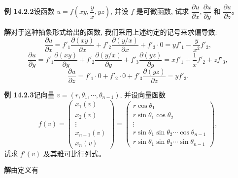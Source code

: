 \documentclass[UTF8,12pt,a4paper,fontset=fandol]{ctexart}
\begin{document}
\noindent\textbf{例 14.2.2}\quad 设函数 $u=f\left(xy,\dfrac yx,yz\right)$, 并设 $f$ 是可微函数, 试求 $\dfrac{\partial u}{\partial x}, \dfrac{\partial u}{\partial y}$ 和 $\dfrac{\partial u}{\partial z}$。

\noindent\textbf{解}\quad 对于这种抽象形式给出的函数, 我们采用上述约定的记号来求偏导数:
\[
  \frac{\partial u}{\partial x}
  =f'_1\frac{\partial(xy)}{\partial x}+f'_2\frac{\partial(y/x)}{\partial x}+f'_3\cdot0
  =yf'_1-\frac{y}{x^2}f'_2,
\]
\[
  \frac{\partial u}{\partial y}
  =f'_1\frac{\partial(xy)}{\partial y}
  +f'_2\frac{\partial(y/x)}{\partial y}
  +f'_3\frac{\partial(yz)}{\partial y}
  =xf'_1+\frac1x f'_2+zf'_3,
\]
\[
  \frac{\partial u}{\partial z}
  =f'_1\cdot0+f'_2\cdot0+f'_3\frac{\partial(yz)}{\partial z}
  =yf'_3.
\]

\noindent\textbf{例 14.2.3}\quad 记向量 $v=(r,\theta_1,\cdots,\theta_{n-1})$, 并设向量函数
\[
  f(v)=
  \begin{pmatrix}
    x_1(v)\\
    x_2(v)\\
    \vdots\\
    x_{n-1}(v)\\
    x_n(v)
  \end{pmatrix}
  =
  \begin{pmatrix}
    r\cos\theta_1\\
    r\sin\theta_1\cos\theta_2\\
    \vdots\\
    r\sin\theta_1\sin\theta_2\cdots\cos\theta_{n-1}\\
    r\sin\theta_1\sin\theta_2\cdots\sin\theta_{n-1}
  \end{pmatrix},
\]
试求 $f'(v)$ 及其雅可比行列式。

\noindent\textbf{解}\quad 由定义有
\end{document}
